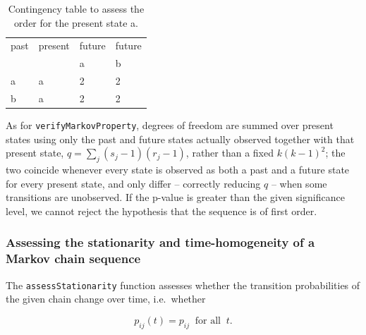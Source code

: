 \documentclass[
  nojss]{jss}
\begin{document}
\begin{table}[h]
  \centering
  \begin{tabular}{l | l | l | l}
    \hline
  past & present & future & future \\
   &  & a & b \\
    \hline  \hline
  a & a & 2 & 2\\
  b & a & 2 & 2\\
  \hline
\end{tabular}
\caption{Contingency table to assess the order for the present state a.}
\label{tab:order}
\end{table}

As for \texttt{verifyMarkovProperty}, degrees of freedom are summed over present states
using only the past and future states actually observed together with that present
state, \(q=\sum_j (s_j-1)(r_j-1)\), rather than a fixed \(k(k-1)^2\); the two coincide
whenever every state is observed as both a past and a future state for every present
state, and only differ -- correctly reducing \(q\) -- when some transitions are unobserved.
If the p-value is greater than the given significance level, we cannot reject the
hypothesis that the sequence is of first order.

\begin{CodeChunk}
\end{CodeChunk}

\subsubsection{Assessing the stationarity and time-homogeneity of a Markov chain sequence}\label{assessing-the-stationarity-and-time-homogeneity-of-a-markov-chain-sequence}

The \texttt{assessStationarity} function assesses whether the transition probabilities of the given chain change over time, i.e.~whether

\begin{equation}
p_{ij}(t) = p_{ij} ~\textrm{ for all }~t.
\label{eq:stationarity}
\end{equation}
\end{document}
